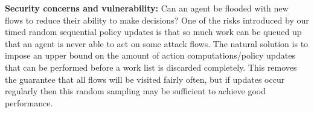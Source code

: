 \documentclass[10pt, times, conference, letterpaper]{IEEEtran}
\newcommand{\fakepara}[1]{\noindent\textbf{#1:}}
\begin{document}
\fakepara{Security concerns and vulnerability}
Can an agent be flooded with new flows to reduce their ability to make decisions?
One of the risks introduced by our timed random sequential policy updates is that so much work can be queued up that an agent is never able to act on some attack flows.
The natural solution is to impose an upper bound on the amount of action computations/policy updates that can be performed before a work list is discarded completely.
This removes the guarantee that all flows will be visited fairly often, but if updates occur regularly then this random sampling may be sufficient to achieve good performance.

%	
%
%	
\end{document}
